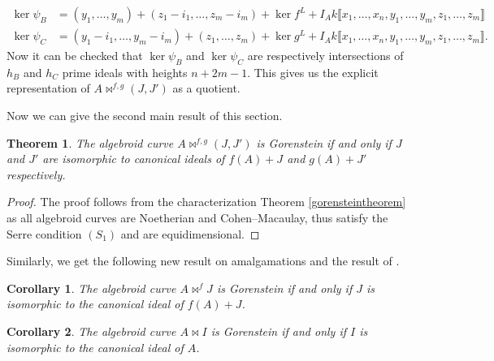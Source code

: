 \documentclass{amsart}%
\newtheorem{theorem}{Theorem}[section]
\theoremstyle{plain}
\newtheorem{corollary}{Corollary}[section]
\numberwithin{equation}{section}
\theoremstyle{definition}
\begin{document}
    \begin{align*}
\ker\psi_B&=(y_1,\ldots,y_m)+(z_1-i_1,\ldots,z_m-i_m)+\ker f^L+I_Ak\llbracket x_1,\ldots ,x_n,y_1,\ldots,y_m,z_1,\ldots,z_m\rrbracket\\
\ker\psi_C&=(y_1-i_1,\ldots,y_m-i_m)+(z_1,\ldots,z_m)+\ker g^L+I_Ak\llbracket x_1,\ldots ,x_n,y_1,\ldots,y_m,z_1,\ldots,z_m\rrbracket.
    \end{align*}
    Now it can be checked that $\ker\psi_B$ and $\ker\psi_C$ are respectively intersections of $h_B$ and $h_C$ prime ideals with heights $n+2m-1$. This gives us the explicit representation of $A\bowtie^{f,g}(J,J')$ as a quotient.\medskip

Now we can give the second main result of this section.

\begin{theorem}\label{algebroidgorthm}
    The algebroid curve $A\bowtie^{f,g}(J,J')$ is Gorenstein if and only if $J$ and $J'$ are isomorphic to canonical ideals of $f(A)+J$ and $g(A)+J'$ respectively. 
\end{theorem}
\begin{proof}
    The proof follows from the characterization Theorem \ref{gorensteintheorem} as all algebroid curves are Noetherian and Cohen--Macaulay, thus satisfy the Serre condition $(S_1)$ and are equidimensional.
\end{proof}
Similarly, we get the following new result on amalgamations and the result of \cite{Gorenstein}.

\begin{corollary}\label{algebroidgorcor}
    The algebroid curve $A\bowtie^{f}J$ is Gorenstein if and only if $J$ is isomorphic to the canonical ideal of $f(A)+J$.
\end{corollary}
\begin{corollary}
        The algebroid curve $A\bowtie I$ is Gorenstein if and only if $I$ is isomorphic to the canonical ideal of $A$.
\end{corollary}
\end{document}
